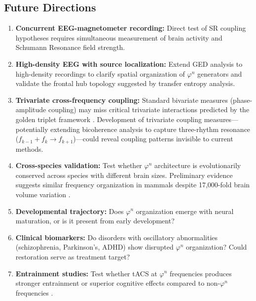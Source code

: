 \documentclass[11pt,a4paper]{article}
\newcommand{\phisym}{\varphi}
\begin{document}
\subsection{Future Directions}

\begin{enumerate}
    \item \textbf{Concurrent EEG-magnetometer recording:} Direct test of SR coupling hypotheses requires simultaneous measurement of brain activity and Schumann Resonance field strength.

    \item \textbf{High-density EEG with source localization:} Extend GED analysis to high-density recordings to clarify spatial organization of $\phisym^n$ generators and validate the frontal hub topology suggested by transfer entropy analysis.

    \item \textbf{Trivariate cross-frequency coupling:} Standard bivariate measures (phase-amplitude coupling) may miss critical trivariate interactions predicted by the golden triplet framework \parencite{kramer2022golden}. Development of trivariate coupling measures---potentially extending bicoherence analysis to capture three-rhythm resonance ($f_{k-1} + f_k \rightarrow f_{k+1}$)---could reveal coupling patterns invisible to current methods.

    \item \textbf{Cross-species validation:} Test whether $\phisym^n$ architecture is evolutionarily conserved across species with different brain sizes. Preliminary evidence suggests similar frequency organization in mammals despite 17,000-fold brain volume variation \parencite{buzsaki2013scaling}.

    \item \textbf{Developmental trajectory:} Does $\phisym^n$ organization emerge with neural maturation, or is it present from early development?

    \item \textbf{Clinical biomarkers:} Do disorders with oscillatory abnormalities (schizophrenia, Parkinson's, ADHD) show disrupted $\phisym^n$ organization? Could restoration serve as treatment target?

    \item \textbf{Entrainment studies:} Test whether tACS at $\phisym^n$ frequencies produces stronger entrainment or superior cognitive effects compared to non-$\phisym^n$ frequencies \parencite{herrmann2016eeg}.


\end{enumerate}
\end{document}
